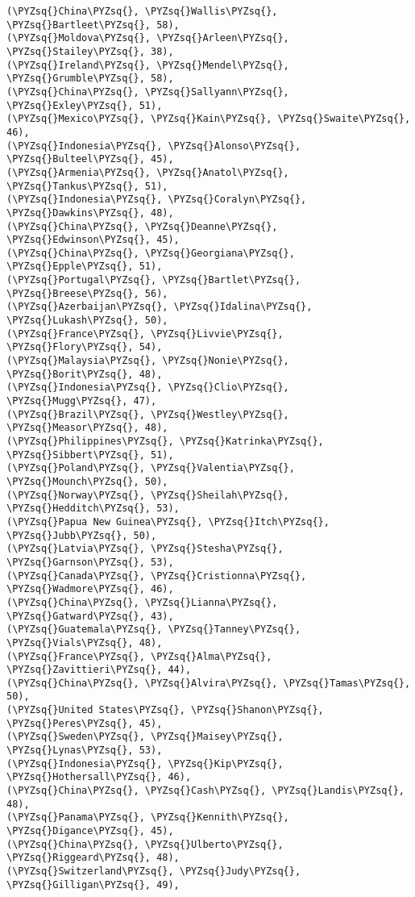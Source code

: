 \documentclass[11pt]{article}
\def\PYZsq{\textquotesingle}%
\def\PYZsq{\char`\'}
\begin{document}
\begin{tcolorbox}[breakable, size=fbox, boxrule=1pt, pad at break*=1mm,colback=cellbackground, colframe=cellborder]
\begin{Verbatim}[commandchars=\\\{\}]
(\PYZsq{}China\PYZsq{}, \PYZsq{}Wallis\PYZsq{}, \PYZsq{}Bartleet\PYZsq{}, 58),
(\PYZsq{}Moldova\PYZsq{}, \PYZsq{}Arleen\PYZsq{}, \PYZsq{}Stailey\PYZsq{}, 38),
(\PYZsq{}Ireland\PYZsq{}, \PYZsq{}Mendel\PYZsq{}, \PYZsq{}Grumble\PYZsq{}, 58),
(\PYZsq{}China\PYZsq{}, \PYZsq{}Sallyann\PYZsq{}, \PYZsq{}Exley\PYZsq{}, 51),
(\PYZsq{}Mexico\PYZsq{}, \PYZsq{}Kain\PYZsq{}, \PYZsq{}Swaite\PYZsq{}, 46),
(\PYZsq{}Indonesia\PYZsq{}, \PYZsq{}Alonso\PYZsq{}, \PYZsq{}Bulteel\PYZsq{}, 45),
(\PYZsq{}Armenia\PYZsq{}, \PYZsq{}Anatol\PYZsq{}, \PYZsq{}Tankus\PYZsq{}, 51),
(\PYZsq{}Indonesia\PYZsq{}, \PYZsq{}Coralyn\PYZsq{}, \PYZsq{}Dawkins\PYZsq{}, 48),
(\PYZsq{}China\PYZsq{}, \PYZsq{}Deanne\PYZsq{}, \PYZsq{}Edwinson\PYZsq{}, 45),
(\PYZsq{}China\PYZsq{}, \PYZsq{}Georgiana\PYZsq{}, \PYZsq{}Epple\PYZsq{}, 51),
(\PYZsq{}Portugal\PYZsq{}, \PYZsq{}Bartlet\PYZsq{}, \PYZsq{}Breese\PYZsq{}, 56),
(\PYZsq{}Azerbaijan\PYZsq{}, \PYZsq{}Idalina\PYZsq{}, \PYZsq{}Lukash\PYZsq{}, 50),
(\PYZsq{}France\PYZsq{}, \PYZsq{}Livvie\PYZsq{}, \PYZsq{}Flory\PYZsq{}, 54),
(\PYZsq{}Malaysia\PYZsq{}, \PYZsq{}Nonie\PYZsq{}, \PYZsq{}Borit\PYZsq{}, 48),
(\PYZsq{}Indonesia\PYZsq{}, \PYZsq{}Clio\PYZsq{}, \PYZsq{}Mugg\PYZsq{}, 47),
(\PYZsq{}Brazil\PYZsq{}, \PYZsq{}Westley\PYZsq{}, \PYZsq{}Measor\PYZsq{}, 48),
(\PYZsq{}Philippines\PYZsq{}, \PYZsq{}Katrinka\PYZsq{}, \PYZsq{}Sibbert\PYZsq{}, 51),
(\PYZsq{}Poland\PYZsq{}, \PYZsq{}Valentia\PYZsq{}, \PYZsq{}Mounch\PYZsq{}, 50),
(\PYZsq{}Norway\PYZsq{}, \PYZsq{}Sheilah\PYZsq{}, \PYZsq{}Hedditch\PYZsq{}, 53),
(\PYZsq{}Papua New Guinea\PYZsq{}, \PYZsq{}Itch\PYZsq{}, \PYZsq{}Jubb\PYZsq{}, 50),
(\PYZsq{}Latvia\PYZsq{}, \PYZsq{}Stesha\PYZsq{}, \PYZsq{}Garnson\PYZsq{}, 53),
(\PYZsq{}Canada\PYZsq{}, \PYZsq{}Cristionna\PYZsq{}, \PYZsq{}Wadmore\PYZsq{}, 46),
(\PYZsq{}China\PYZsq{}, \PYZsq{}Lianna\PYZsq{}, \PYZsq{}Gatward\PYZsq{}, 43),
(\PYZsq{}Guatemala\PYZsq{}, \PYZsq{}Tanney\PYZsq{}, \PYZsq{}Vials\PYZsq{}, 48),
(\PYZsq{}France\PYZsq{}, \PYZsq{}Alma\PYZsq{}, \PYZsq{}Zavittieri\PYZsq{}, 44),
(\PYZsq{}China\PYZsq{}, \PYZsq{}Alvira\PYZsq{}, \PYZsq{}Tamas\PYZsq{}, 50),
(\PYZsq{}United States\PYZsq{}, \PYZsq{}Shanon\PYZsq{}, \PYZsq{}Peres\PYZsq{}, 45),
(\PYZsq{}Sweden\PYZsq{}, \PYZsq{}Maisey\PYZsq{}, \PYZsq{}Lynas\PYZsq{}, 53),
(\PYZsq{}Indonesia\PYZsq{}, \PYZsq{}Kip\PYZsq{}, \PYZsq{}Hothersall\PYZsq{}, 46),
(\PYZsq{}China\PYZsq{}, \PYZsq{}Cash\PYZsq{}, \PYZsq{}Landis\PYZsq{}, 48),
(\PYZsq{}Panama\PYZsq{}, \PYZsq{}Kennith\PYZsq{}, \PYZsq{}Digance\PYZsq{}, 45),
(\PYZsq{}China\PYZsq{}, \PYZsq{}Ulberto\PYZsq{}, \PYZsq{}Riggeard\PYZsq{}, 48),
(\PYZsq{}Switzerland\PYZsq{}, \PYZsq{}Judy\PYZsq{}, \PYZsq{}Gilligan\PYZsq{}, 49),

\end{Verbatim}
\end{tcolorbox}
\end{document}
